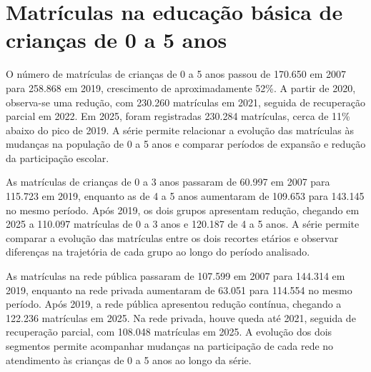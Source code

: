 
\section{Matrículas na educação básica de crianças de 0 a 5 anos}


O número de matrículas de crianças de 0 a 5 anos passou de 170.650 em 2007 para 258.868 em 2019, crescimento de aproximadamente 52\%. A partir de 2020, observa-se uma redução, com 230.260 matrículas em 2021, seguida de recuperação parcial em 2022. Em 2025, foram registradas 230.284 matrículas, cerca de 11\% abaixo do pico de 2019. A série permite relacionar a evolução das matrículas às mudanças na população de 0 a 5 anos e comparar períodos de expansão e redução da participação escolar.


As matrículas de crianças de 0 a 3 anos passaram de 60.997 em 2007 para 115.723 em 2019, enquanto as de 4 a 5 anos aumentaram de 109.653 para 143.145 no mesmo período. Após 2019, os dois grupos apresentam redução, chegando em 2025 a 110.097 matrículas de 0 a 3 anos e 120.187 de 4 a 5 anos. A série permite comparar a evolução das matrículas entre os dois recortes etários e observar diferenças na trajetória de cada grupo ao longo do período analisado.


As matrículas na rede pública passaram de 107.599 em 2007 para 144.314 em 2019, enquanto na rede privada aumentaram de 63.051 para 114.554 no mesmo período. Após 2019, a rede pública apresentou redução contínua, chegando a 122.236 matrículas em 2025. Na rede privada, houve queda até 2021, seguida de recuperação parcial, com 108.048 matrículas em 2025. A evolução dos dois segmentos permite acompanhar mudanças na participação de cada rede no atendimento às crianças de 0 a 5 anos ao longo da série.

